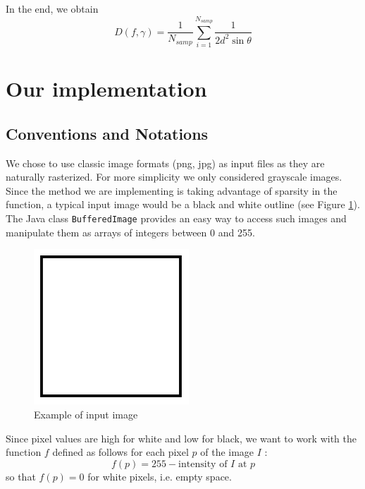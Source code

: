 \documentclass[10pt,a4paper]{article}			%
\begin{document}
In the end, we obtain $$D(f,\gamma) = \frac{1}{N_{samp}} \sum_{i=1}^{N_{samp}}\frac{1}{2d^2\sin\theta}$$


	
	\section{Our implementation}

	\subsection {Conventions and Notations}
We chose to use classic image formats (png, jpg) as input files as they are naturally rasterized. For more simplicity we only considered grayscale images. Since the method we are implementing is taking advantage of sparsity in the function, a typical input image would be a black and white outline (see Figure \ref{exemple_carre}). The Java class \texttt{BufferedImage} provides an easy way to access such images and manipulate them as arrays of integers between 0 and 255. 
\begin{figure}[h]
\begin{center}
\includegraphics[scale=0.5]{img/carre.png}
\caption{Example of input image}
\label{exemple_carre}
\end{center}
\end{figure}

Since pixel values are high for white and low for black, we want to work with the function $f$ defined as follows for each pixel $p$ of the image $I$ :
\[f(p) = 255 - \text{intensity of $I$ at $p$}\]
so that $f(p)=0$ for white pixels, i.e. empty space.
\end{document}
